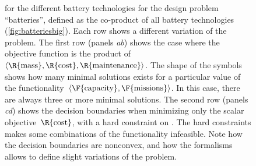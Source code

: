 \begin{figure}
{for the different battery technologies for the design problem ``batteries'',
defined as the co-product of all battery technologies (\cref{fig:batteriesbig}).
Each row shows a different variation of the problem. The first row
(panels \emph{a}\textendash \emph{b}) shows the case where the objective
function is the product of~$\left\langle \R{\text{mass}},\R{\text{cost}},\R{\text{maintenance}}\right\rangle $.
The shape of the symbols shows how many minimal solutions exists for
a particular value of the functionality~$\left\langle \F{\text{capacity}},\F{\text{missions}}\right\rangle $.
In this case, there are always three or more minimal solutions. The
second row (panels \emph{c}\textendash \emph{d}) shows the decision
boundaries when minimizing only the scalar objective~$\R{\text{cost}}$,
with a hard constraint on . The hard constraints makes some
combinations of the functionality infeasible. Note how the decision
boundaries are nonconvex, and how the formalisms allows to define
slight variations of the problem.}
\end{figure}
